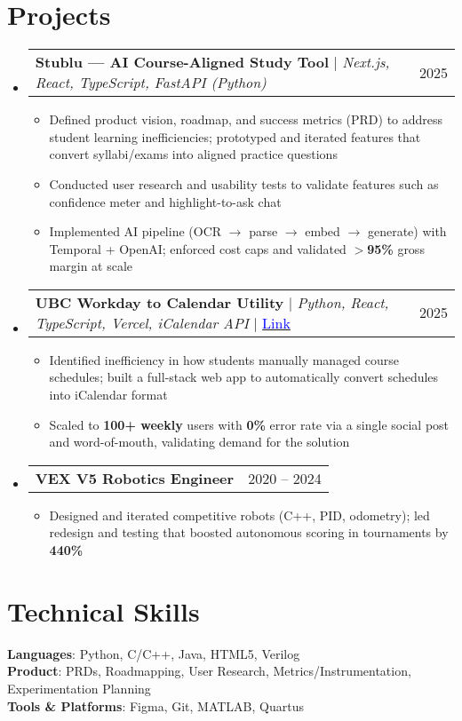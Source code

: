 \documentclass[letterpaper,11pt]{article} %
\makeatletter
\newcommand{\resumeItem}[1]{\item\small{{#1 \vspace{-2pt}}}}
\newcommand{\resumeProjectHeading}[2]{
    \item
    \begin{tabular*}{0.97\textwidth}{l@{\extracolsep{\fill}}r}
      \small#1 & #2 \\
    \end{tabular*}\vspace{-5pt}
}
\newcommand{\resumeSubHeadingListStart}{\begin{itemize}[leftmargin=0.15in, label={}]}
\newcommand{\resumeSubHeadingListEnd}{\end{itemize}}
\newcommand{\resumeItemListStart}{\begin{itemize}[leftmargin=0.15in]}
\newcommand{\resumeItemListEnd}{\end{itemize}\vspace{-5.5pt}}
\makeatother
\begin{document}
\section{Projects}
  \resumeSubHeadingListStart
    \resumeProjectHeading
      {\textbf{Stublu — AI Course-Aligned Study Tool} $|$ \textit{Next.js, React, TypeScript, FastAPI (Python)}}{2025}
      \resumeItemListStart
        \resumeItem{Defined product vision, roadmap, and success metrics (PRD) to address student learning inefficiencies; prototyped and iterated features that convert syllabi/exams into aligned practice questions}
        \resumeItem{Conducted user research and usability tests to validate features such as confidence meter and highlight-to-ask chat}
        \resumeItem{Implemented AI pipeline (OCR $\rightarrow$ parse $\rightarrow$ embed $\rightarrow$ generate) with Temporal + OpenAI; enforced cost caps and validated $>$\textbf{95\%} gross margin at scale}
      \resumeItemListEnd

    \resumeProjectHeading
      {\textbf{UBC Workday to Calendar Utility} $|$ \textit{Python, React, TypeScript, Vercel, iCalendar API} $|$ \href{https://ubcworkdaycalendartool.vercel.app/}{\textcolor{blue}{Link}}}{2025}
      \resumeItemListStart
        \resumeItem{Identified inefficiency in how students manually managed course schedules; built a full-stack web app to automatically convert schedules into iCalendar format}
        \resumeItem{Scaled to \textbf{100+ weekly} users with \textbf{0\%} error rate via a single social post and word-of-mouth, validating demand for the solution}
      \resumeItemListEnd

    \resumeProjectHeading
      {\textbf{VEX V5 Robotics Engineer}}{2020 -- 2024}
      \resumeItemListStart
        \resumeItem{Designed and iterated competitive robots (C++, PID, odometry); led redesign and testing that boosted autonomous scoring in tournaments by \textbf{440\%}}
      \resumeItemListEnd
  \resumeSubHeadingListEnd

\section{Technical Skills}
  \begin{itemize}[leftmargin=0.15in, label={}]
    \small{\item{\textbf{Languages}{: Python, C/C++, Java, HTML5, Verilog} \\
    \textbf{Product}{: PRDs, Roadmapping, User Research, Metrics/Instrumentation, Experimentation Planning} \\
    \textbf{Tools \& Platforms}{: Figma, Git, MATLAB, Quartus}}}
  \end{itemize}
\end{document}
